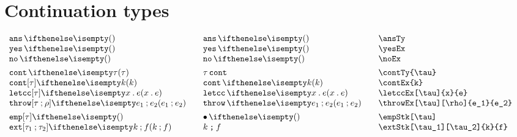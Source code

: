 \documentclass[11pt]{article}
\begin{document}
\section*{Continuation types}
\begin{small}
  \begin{displaymath}
    \begin{array}{l@{\qquad}l@{\qquad}l@{\qquad}l}
      \ansTy                         & \ansTy*             & \verb|\ansTy|                         \\
      \yesEx                         & \yesEx*             & \verb|\yesEx|                         \\
      \noEx                          & \noEx*              & \verb|\noEx|                          \\[1ex]

      \contTy{\tau}                  & \contTy*{\tau}      & \verb|\contTy{\tau}|                  \\
      \contEx{k}                     & \contEx*{k}         & \verb|\contEx{k} |                    \\
      \letccEx[\tau]{x}{e}           & \letccEx*{x}{e}     & \verb|\letccEx[\tau]{x}{e}|           \\
      \throwEx[\tau][\rho]{e_1}{e_2} & \throwEx*{e_1}{e_2} & \verb|\throwEx[\tau][\rho]{e_1}{e_2}| \\[1ex]

      \empStk[\tau]                  & \empStk*[\tau]      & \verb|\empStk[\tau]|                  \\
      \extStk[\tau_1][\tau_2]{k}{f}  & \extStk*{k}{f}      & \verb|\extStk[\tau_1][\tau_2]{k}{f}|
    \end{array}
  \end{displaymath}
\end{small}
\end{document}
